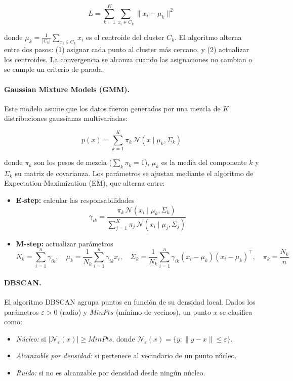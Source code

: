 \documentclass[11pt]{article}
\begin{document}
\[
L = \sum_{k=1}^{K} \sum_{x_i \in C_k} \|x_i - \mu_k\|^2
\]

donde $\mu_k = \frac{1}{|C_k|} \sum_{x_i \in C_k} x_i$ es el centroide del cluster $C_k$. El algoritmo alterna entre dos pasos: (1) asignar cada punto al cluster más cercano, y (2) actualizar los centroides. La convergencia se alcanza cuando las asignaciones no cambian o se cumple un criterio de parada.

\paragraph{Gaussian Mixture Models (GMM).} Este modelo asume que los datos fueron generados por una mezcla de $K$ distribuciones gaussianas multivariadas:

\[
p(x) = \sum_{k=1}^{K} \pi_k \, \mathcal{N}(x \mid \mu_k, \Sigma_k)
\]

donde $\pi_k$ son los pesos de mezcla ($\sum_k \pi_k = 1$), $\mu_k$ es la media del componente $k$ y $\Sigma_k$ su matriz de covarianza. Los parámetros se ajustan mediante el algoritmo de Expectation-Maximization (EM), que alterna entre:

\begin{itemize}
    \item \textbf{E-step:} calcular las responsabilidades
    \[
    \gamma_{ik} = \frac{\pi_k \, \mathcal{N}(x_i \mid \mu_k, \Sigma_k)}{\sum_{j=1}^{K} \pi_j \, \mathcal{N}(x_i \mid \mu_j, \Sigma_j)}
    \]
    \item \textbf{M-step:} actualizar parámetros
    \[
    N_k = \sum_{i=1}^{n} \gamma_{ik}, \quad
    \mu_k = \frac{1}{N_k} \sum_{i=1}^{n} \gamma_{ik} x_i, \quad
    \Sigma_k = \frac{1}{N_k} \sum_{i=1}^{n} \gamma_{ik} (x_i - \mu_k)(x_i - \mu_k)^\top, \quad
    \pi_k = \frac{N_k}{n}
    \]
\end{itemize}

\paragraph{DBSCAN.} El algoritmo DBSCAN agrupa puntos en función de su densidad local. Dados los parámetros $\varepsilon > 0$ (radio) y $MinPts$ (mínimo de vecinos), un punto $x$ se clasifica como:

\begin{itemize}
    \item \textit{Núcleo:} si $|\mathcal{N}_\varepsilon(x)| \geq MinPts$, donde $\mathcal{N}_\varepsilon(x) = \{y : \|y - x\| \leq \varepsilon\}$.
    \item \textit{Alcanzable por densidad:} si pertenece al vecindario de un punto núcleo.
    \item \textit{Ruido:} si no es alcanzable por densidad desde ningún núcleo.
\end{itemize}
\end{document}
